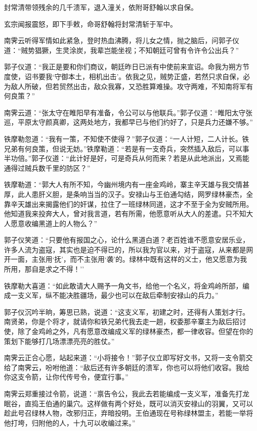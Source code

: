 \documentclass[12pt,oneside]{book}
\begin{document}
封常清带领残余的几千溃军，退入潼关，依附哥舒翰以求自保。

玄宗闻报震怒，即下手敕，命哥舒翰将封常清斩于军中。

南霁云听得军情如此紧急，登时热血沸腾，将儿女之情，抛之脑后，问郭子仪道：``贼势猖獗，生灵涂炭，我辈岂能坐视；不知朝廷可曾有令许令公出兵？''

郭子仪道：``我正是要和你们商议，朝廷昨日已派有中使前来宣诏。命我为朔方节度使，诏书要我`守御本土，相机出击'。依我之见，贼势正盛，若然只求自保，必为敌人所破，但若贸然出击，敌众我寡，又恐胜算难操。攻守两难，不知南将军有何良策？''

南霁云道：``张太守在睢阳早有准备，令公可以与他联兵。''郭子仪道：``睢阳太守张巡，平原太守颜真卿，这两处地方，我都早已与他们约好了，只是兵力还嫌不够。''

铁摩勒忽道：``我有一策，不知使不使得？''郭子仪道：``一人计短，二人计长。铁兄弟有何良策，但说无妨。''铁摩勒道：``若是有一支奇兵，突然插入敌后，可以事半功倍。''郭子仪道：``此计好是好，可是奇兵从何而来？若是从此地派出，又焉能通得过贼兵数千里的防区？''

铁摩勒道：``郭大人有所不知，今幽州境内有一座金鸡岭，寨主辛天雄与我交情甚厚，此人患肝义胆，是条响当当的汉子。安禄山与王伯通勾结，网罗绿林豪杰，全靠辛天雄出来揭露他们的奸谋，拉住了一班绿林同道，这才不至于全为安贼所用。他知道我来投奔大人，曾对我言道，若有所需，他愿意听从大人的差遣。只不知大人愿意收编黑道上的人物么？''

郭子仪笑道：``只要他有报国之心，论什么黑道白道？老百姓谁不愿意安居乐业，许多人流为盗寇，其实也是迫不得已的，所以我为官以来，对于盗寇，从来都是网开一面，主张用`抚'，而不主张用`袭'的。绿林中既有这样的义士，他又愿意为我所用，那自是求之不得！''

铁摩勒大喜道：``如此敢请大人赐予一角文书，给他一个名义，将金鸡岭所部，编成一支义军，纵不能决胜疆场，最少也可以在敌后牵制安禄山的兵力。''

郭子仪沉吟半晌，筹思已熟，说道：``这支义军，初建之时，还得有人策划才行。南贤弟，你是个将才，就请你和铁兄弟代我去走一趟，权委那辛寨主为敌后招讨使，除了金鸡岭之外，凡有愿意改编成义军的绿林豪杰，都一律收容。但望在你的策划下能够打几场漂漂亮亮的胜仗。''

南霁云正合心愿，站起来道：``小将接令！''郭子仪立即写好文书，又将一支令箭交给了南霁云，吩咐他道：``敌后还有许多朝廷的溃军，你也可以将他们收容。我给你这支令箭，让你代传号令，便宜行事。''

南霁云郑重接过令箭，说道：``禀告令公，我此去若能编成一支义军，准备先打龙眠谷，直捣王伯通的巢穴。这样做有两个好处，既可以消灭安禄山的羽翼，又可以趁此号召绿林人物，改邪归正，弃暗投明。王伯通现在号称绿林盟主，若能一举将他打垮，归附他的人，十九可以收编过来。''
\end{document}
